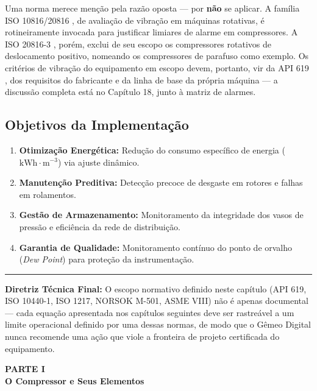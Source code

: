 \documentclass[12pt,a4paper]{article}
\numberwithin{equation}{section}
\numberwithin{table}{section}
\numberwithin{figure}{section}
\begin{document}
{	Uma norma merece menção pela razão oposta — por \textbf{não} se aplicar. A família ISO 10816/20816 \cite{iso10816, iso20816}, de avaliação de vibração em máquinas rotativas, é rotineiramente invocada para justificar limiares de alarme em compressores. A ISO 20816-3 \cite{iso20816}, porém, exclui de seu escopo os compressores rotativos de deslocamento positivo, nomeando os compressores de parafuso como exemplo. Os critérios de vibração do equipamento em escopo devem, portanto, vir da API 619 \cite{api619}, dos requisitos do fabricante e da linha de base da própria máquina — a discussão completa está no Capítulo 18, junto à matriz de alarmes.
	
	\subsection{\textbf{Objetivos da Implementação}}
	\begin{enumerate}
		\item \textbf{Otimização Energética:} Redução do consumo específico de energia ($\text{kWh} \cdot \text{m}^{-3}$) via ajuste dinâmico.
		\item \textbf{Manutenção Preditiva:} Detecção precoce de desgaste em rotores e falhas em rolamentos.
		\item \textbf{Gestão de Armazenamento:} Monitoramento da integridade dos vasos de pressão e eficiência da rede de distribuição.
		\item \textbf{Garantia de Qualidade:} Monitoramento contínuo do ponto de orvalho (\textit{Dew Point}) para proteção da instrumentação.
	\end{enumerate}

	\vspace{1em}
	\hrule
	\vspace{1em}

	\textbf{Diretriz Técnica Final:} O escopo normativo definido neste capítulo (API 619, ISO 10440-1, ISO 1217, NORSOK M-501, ASME VIII) não é apenas documental — cada equação apresentada nos capítulos seguintes deve ser rastreável a um limite operacional definido por uma dessas normas, de modo que o Gêmeo Digital nunca recomende uma ação que viole a fronteira de projeto certificada do equipamento.

	\clearpage
	\thispagestyle{empty}
	\vspace*{\fill}
	\begin{center}
		{\Huge\bfseries PARTE I}\\[2em]
		{\huge\bfseries O Compressor e Seus Elementos}
	\end{center}
	\vspace*{\fill}
	\clearpage

}
\end{document}
